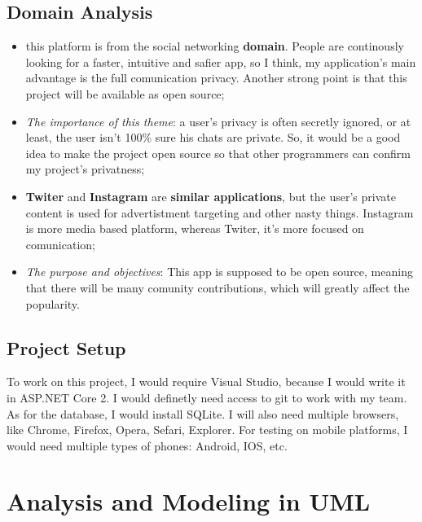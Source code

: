 \documentclass{article}
\begin{document}
		\subsection{Domain Analysis}
			\begin{itemize}
				\item this platform is from the social networking \textbf{domain}. People are continously looking for a faster, intuitive and safier app, so I think, my application's main advantage is the full comunication privacy. Another strong point is that this project will be available as open source;
				
				\item \textit{The importance of this theme}: a user's privacy is often secretly ignored, or at least, the user isn't 100\% sure his chats are private. So, it would be a good idea to make the project open source so that other programmers can confirm my project's privatness;
				
				\item \textbf{Twiter} and \textbf{Instagram} are \textbf{similar applications}, but the user's private content is used for advertistment targeting and other nasty things. Instagram is more media based platform, whereas Twiter, it's more focused on comunication;
				
				\item \textit{The purpose and objectives}: This app is supposed to be open source, meaning that there will be many comunity contributions, which will greatly affect the popularity.
			\end{itemize}

		\subsection{Project Setup}
			To work on this project, I would require Visual Studio, because I would write it in ASP.NET Core 2. I would definetly need access to git to work with my team. As for the database, I would install SQLite. I will also need multiple browsers, like Chrome, Firefox, Opera, Sefari, Explorer. For testing on mobile platforms, I would need multiple types of phones: Android, IOS, etc.



	\section{Analysis and Modeling in UML}
\end{document}

